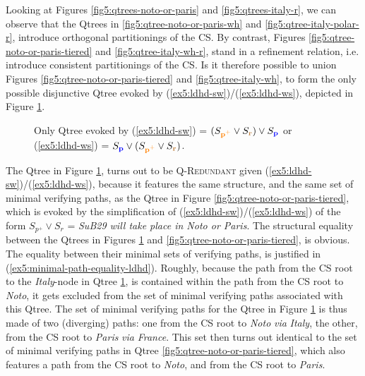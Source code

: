 Looking at Figures \ref{fig5:qtrees-noto-or-paris} and \ref{fig5:qtrees-italy-r}, we can observe that the Qtrees in \ref{fig5:qtree-noto-or-paris-wh} and \ref{fig5:qtree-italy-polar-r}, introduce orthogonal partitionings of the CS. By contrast, Figures \ref{fig5:qtree-noto-or-paris-tiered} and \ref{fig5:qtree-italy-wh-r}, stand in a refinement relation, i.e. introduce consistent partitionings of the CS. Is it therefore possible to union Figures \ref{fig5:qtree-noto-or-paris-tiered} and \ref{fig5:qtree-italy-wh}, to form the only possible disjunctive Qtree evoked by (\ref{ex5:ldhd-sw})/(\ref{ex5:ldhd-ws}), depicted in Figure \ref{fig5:qtree-ldhd}.

\begin{figure}[H]
	\centering
	\caption[]{Only Qtree evoked by (\ref{ex5:ldhd-sw}) = $(S_{\textbf{\textcolor{orange}{p$^+$}}} \vee S_{\textbf{\textcolor{brown}{r}}}) \vee S_{\textbf{\textcolor{blue}{p}}}$ or (\ref{ex5:ldhd-ws}) = $S_{\textbf{\textcolor{blue}{p}}} \vee (S_{\textbf{\textcolor{orange}{p$^+$}}} \vee S_{\textbf{\textcolor{brown}{r}}})$.}\label{fig5:qtree-ldhd}
\end{figure}

The Qtree in Figure \ref{fig5:qtree-ldhd}, turns out to be \textsc{Q-Redundant} given (\ref{ex5:ldhd-sw})/(\ref{ex5:ldhd-ws}), because it features the same structure, and the same set of minimal verifying paths, as the Qtree in Figure \ref{fig5:qtree-noto-or-paris-tiered}, which is evoked by the simplification of (\ref{ex5:ldhd-sw})/(\ref{ex5:ldhd-ws}) of the form $S_{p^+} \vee S_r$ = \textit{SuB29 will take place in Noto or Paris}. The structural equality between the Qtrees in Figures \ref{fig5:qtree-ldhd} and \ref{fig5:qtree-noto-or-paris-tiered}, is obvious. The equality between their minimal sets of verifying paths, is justified in (\ref{ex5:minimal-path-equality-ldhd}). Roughly, because the path from the CS root to the \textit{Italy}-node in Qtree \ref{fig5:qtree-ldhd}, is contained within the path from the CS root to \textit{Noto}, it gets excluded from the set of minimal verifying paths associated with this Qtree. The set of minimal verifying paths for the Qtree in Figure \ref{fig5:qtree-ldhd} is thus made of two (diverging) paths: one from the CS root to \textit{Noto} \textit{via} \textit{Italy}, the other, from the CS root to \textit{Paris} \textit{via} \textit{France}. This set then turns out identical to the set of minimal verifying paths in Qtree \ref{fig5:qtree-noto-or-paris-tiered}, which also features a path from the CS root to \textit{Noto}, and from the CS root to \textit{Paris}.

